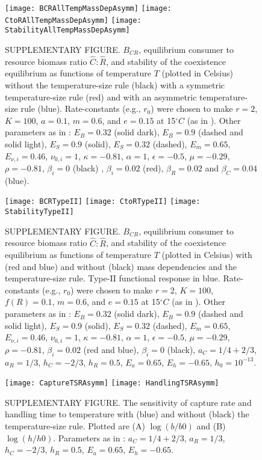 \documentclass[11pt]{article}
\begin{document}
\begin{figure}[!ht]
\centering
\texttt{[image: BCRAllTempMassDepAsymm]}
\texttt{[image: CtoRAllTempMassDepAsymm]}
\texttt{[image: StabilityAllTempMassDepAsymm]}
\caption{
SUPPLEMENTARY FIGURE.
$B_{CR}$, equilibrium consumer to resource biomass ratio $\hat{C}:\hat{R}$, and stability of the coexistence equilibrium as functions of temperature $T$ (plotted in Celsius) without the temperature-size rule (black) with a symmetric temperature-size rule (red) and with an asymmetric temperature-size rule (blue).
Rate-constants (e.g., $r_0$) were chosen to make $r = 2$, $K = 100$, $a = 0.1$, $m = 0.6$, and $e = 0.15$ at 15$^\circ C$ (as in \cite{Gilbert2014}).
Other parameters as in \cite{Gilbert2014,DeLong2015,Forster2012}: $E_B = 0.32$ (solid dark), $E_B = 0.9$ (dashed and solid light), $E_S = 0.9$ (solid), $E_S = 0.32$ (dashed), $E_m = 0.65$, $E_{\nu,i} = 0.46$, $\nu_{0,i} = 1$, $\kappa = -0.81$, $\alpha = 1$, $\epsilon = -0.5$, $\mu = -0.29$, $\rho = -0.81$, $\beta_i = 0$ (black) , $\beta_i = 0.02$ (red), $\beta_R = 0.02$ and $\beta_C = 0.04$ (blue).  
}
\label{AllTempMassDepAsymm}
\end{figure}

\begin{figure}[!ht]
\centering
\texttt{[image: BCRTypeII]}
\texttt{[image: CtoRTypeII]}
\texttt{[image: StabilityTypeII]}
\caption{
SUPPLEMENTARY FIGURE.
$B_{CR}$, equilibrium consumer to resource biomass ratio $\hat{C}:\hat{R}$, and stability of the coexistence equilibrium as functions of temperature $T$ (plotted in Celsius) with (red and blue) and without (black) mass dependencies and the temperature-size rule.
Type-II functional response in blue.
Rate-constants (e.g., $r_0$) were chosen to make $r = 2$, $K = 100$, $f(R) = 0.1$, $m = 0.6$, and $e = 0.15$ at 15$^\circ C$ (as in \cite{Gilbert2014}).
Other parameters as in \cite{Gilbert2014,DeLong2015,Rall2012}: $E_B = 0.32$ (solid dark), $E_B = 0.9$ (dashed and solid light), $E_S = 0.9$ (solid), $E_S = 0.32$ (dashed), $E_m = 0.65$, $E_{\nu,i} = 0.46$, $\nu_{0,i} = 1$, $\kappa = -0.81$, $\alpha = 1$, $\epsilon = -0.5$, $\mu = -0.29$, $\rho = -0.81$, $\beta_i = 0.02$ (red and blue), $\beta_i = 0$ (black), $a_C = 1/4+2/3$, $a_R = 1/3$, $h_C = -2/3$, $h_R = 0.5$, $E_a = 0.65$, $E_h = -0.65$, $h_0 = 10^{-13}$.  
}
\label{TypeII}
\end{figure}

\begin{figure}[!ht]
\centering
\texttt{[image: CaptureTSRAsymm]}
\texttt{[image: HandlingTSRAsymm]}
\caption{
SUPPLEMENTARY FIGURE.
The sensitivity of capture rate and handling time to temperature with (blue) and without (black) the temperature-size rule.
Plotted are (A) $\log(b/b0)$ and (B) $\log(h/h0)$.
Parameters as in \cite{Rall2012}: $a_C = 1/4+2/3$, $a_R = 1/3$, $h_C = -2/3$, $h_R = 0.5$, $E_a = 0.65$, $E_h = -0.65$.
}
\label{CaptureTimeT}
\end{figure}
\end{document}
